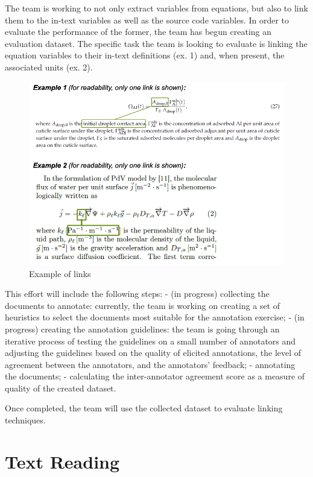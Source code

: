 \documentclass[article, 12pt, oneside]{memoir}
\begin{document}
The team is working to not only extract variables from equations, but
also to link them to the in-text variables as well as the source code
variables. In order to evaluate the performance of the former, the team
has begun creating an evaluation dataset. The specific task the team is
looking to evaluate is linking the equation variables to their in-text
definitions (ex. 1) and, when present, the associated units (ex. 2).

\begin{figure}
\centering
\includegraphics{figs/annotation_example.png}
\caption{Example of links}
\end{figure}

This effort will include the following steps: - (in progress) collecting
the documents to annotate: currently, the team is working on creating a
set of heuristics to select the documents most suitable for the
annotation exercise; - (in progress) creating the annotation guidelines:
the team is going through an iterative process of testing the guidelines
on a small number of annotators and adjusting the guidelines based on
the quality of elicited annotations, the level of agreement between the
annotators, and the annotators' feedback; - annotating the documents; -
calculating the inter-annotator agreement score as a measure of quality
of the created dataset.

Once completed, the team will use the collected dataset to evaluate
linking techniques.

\hypertarget{text-reading}{%
\section{Text Reading}\label{text-reading}}
\end{document}
